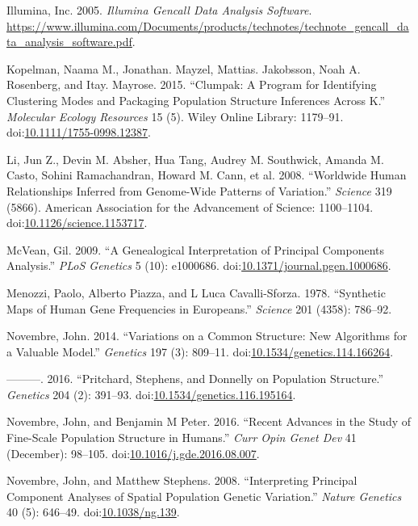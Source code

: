 \documentclass[smallextended]{svjour3}       %
\begin{document}
\hypertarget{ref-GenCall}{}
Illumina, Inc. 2005. \emph{Illumina Gencall Data Analysis Software}.
\url{https://www.illumina.com/Documents/products/technotes/technote_gencall_data_analysis_software.pdf}.

\hypertarget{ref-Kopelman15}{}
Kopelman, Naama M., Jonathan. Mayzel, Mattias. Jakobsson, Noah A.
Rosenberg, and Itay. Mayrose. 2015. ``Clumpak: A Program for Identifying
Clustering Modes and Packaging Population Structure Inferences Across
K.'' \emph{Molecular Ecology Resources} 15 (5). Wiley Online Library:
1179--91.
doi:\href{https://doi.org/10.1111/1755-0998.12387}{10.1111/1755-0998.12387}.

\hypertarget{ref-Li08}{}
Li, Jun Z., Devin M. Absher, Hua Tang, Audrey M. Southwick, Amanda M.
Casto, Sohini Ramachandran, Howard M. Cann, et al. 2008. ``Worldwide
Human Relationships Inferred from Genome-Wide Patterns of Variation.''
\emph{Science} 319 (5866). American Association for the Advancement of
Science: 1100--1104.
doi:\href{https://doi.org/10.1126/science.1153717}{10.1126/science.1153717}.

\hypertarget{ref-McVean09}{}
McVean, Gil. 2009. ``A Genealogical Interpretation of Principal
Components Analysis.'' \emph{PLoS Genetics} 5 (10): e1000686.
doi:\href{https://doi.org/10.1371/journal.pgen.1000686}{10.1371/journal.pgen.1000686}.

\hypertarget{ref-Menozzi78}{}
Menozzi, Paolo, Alberto Piazza, and L Luca Cavalli-Sforza. 1978.
``Synthetic Maps of Human Gene Frequencies in Europeans.''
\emph{Science} 201 (4358): 786--92.

\hypertarget{ref-Novembre14}{}
Novembre, John. 2014. ``Variations on a Common Structure: New Algorithms
for a Valuable Model.'' \emph{Genetics} 197 (3): 809--11.
doi:\href{https://doi.org/10.1534/genetics.114.166264}{10.1534/genetics.114.166264}.

\hypertarget{ref-Novembre16a}{}
---------. 2016. ``Pritchard, Stephens, and Donnelly on Population
Structure.'' \emph{Genetics} 204 (2): 391--93.
doi:\href{https://doi.org/10.1534/genetics.116.195164}{10.1534/genetics.116.195164}.

\hypertarget{ref-Novembre16b}{}
Novembre, John, and Benjamin M Peter. 2016. ``Recent Advances in the
Study of Fine-Scale Population Structure in Humans.'' \emph{Curr Opin
Genet Dev} 41 (December): 98--105.
doi:\href{https://doi.org/10.1016/j.gde.2016.08.007}{10.1016/j.gde.2016.08.007}.

\hypertarget{ref-Novembre08a}{}
Novembre, John, and Matthew Stephens. 2008. ``Interpreting Principal
Component Analyses of Spatial Population Genetic Variation.''
\emph{Nature Genetics} 40 (5): 646--49.
doi:\href{https://doi.org/10.1038/ng.139}{10.1038/ng.139}.
\end{document}
